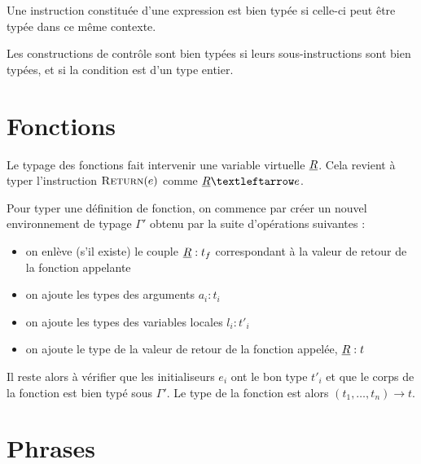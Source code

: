 Une instruction constituée d'une expression est bien typée si celle-ci peut être
typée dans ce même contexte.

\begin{mathpar}
\end{mathpar}

Les constructions de contrôle sont bien typées si leurs sous-instructions sont
bien typées, et si la condition est d'un type entier.

\begin{mathpar}

\end{mathpar}

\section{Fonctions}

Le typage des fonctions fait intervenir une variable virtuelle $\vRet$. Cela
revient à typer l'instruction $\iReturn{e}$ comme $\vRet ← e$.

\begin{mathpar}
\end{mathpar}

Pour typer une définition de fonction, on commence par créer un nouvel
environnement de typage $Γ'$ obtenu par la suite d'opérations suivantes :

\begin{itemize}
\item
  on enlève (s'il existe) le couple $\vRet : t_f$ correspondant à la
  valeur de retour de la fonction appelante
\item
  on ajoute les types des arguments $a_i : t_i$
\item
  on ajoute les types des variables locales $l_i : t'_i$
\item
  on ajoute le type de la valeur de retour de la fonction appelée,
  $\vRet : t$
\end{itemize}

Il reste alors à vérifier que les initialiseurs $e_i$ ont le bon type $t'_i$ et
que le corps de la fonction est bien typé sous $Γ'$. Le type de la fonction est
alors $(t_1, …, t_n) → t$.

\begin{mathpar}
\end{mathpar}

\section{Phrases}

